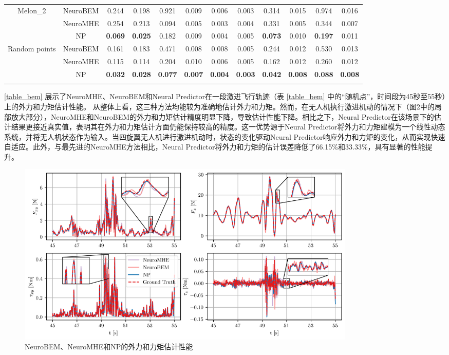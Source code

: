 \documentclass[lang=chs, degree=master, blindreview=true, winfonts=true]{yanputhesis}
\begin{document}
\begin{table}[h]
\begin{tabular}{c c c c c c c c c c c c}
	\hline
	\multirow{3}{*}{Melon\_2} & NeuroBEM & 0.244 & 0.198 & 0.921 & 0.009 & 0.006 & 0.003 & 0.314 & 0.015 & 0.974 & 0.016 \\
	& NeuroMHE & 0.254 & 0.213 & 0.094 & 0.005 & 0.003 & 0.004 & 0.331 & 0.005 & 0.344 & 0.007 \\
	& NP & \textbf{0.069} & \textbf{0.025} & 0.182 & 0.009 & 0.004 & 0.005 & \textbf{0.073} & 0.010 & \textbf{0.197} & 0.011 \\
	\hline
	\multirow{3}{*}{Random points} & NeuroBEM & 0.161 & 0.183 & 0.471 & 0.008 & 0.008 & 0.005 & 0.244 & 0.012 & 0.530 & 0.013 \\
	& NeuroMHE & 0.115 & 0.114 & 0.204 & 0.010 & 0.006 & 0.005 & 0.162 & 0.012 & 0.260 & 0.012 \\
	& NP & \textbf{0.032} & \textbf{0.028} & \textbf{0.077} & \textbf{0.007} & \textbf{0.004} & \textbf{0.003} & \textbf{0.042} & \textbf{0.008} & \textbf{0.088} & \textbf{0.008} \\
	\Xhline{1.pt}
\end{tabular}
\end{table}

\autoref{table_bem} 展示了NeuroMHE、NeuroBEM和Neural Predictor在一段激进飞行轨迹（表 \ref{table_bem} 中的“随机点”，时间段为45秒至55秒）上的外力和力矩估计性能。
从整体上看，这三种方法均能较为准确地估计外力和力矩。然而，在无人机执行激进机动的情况下（图2中的局部放大部分），NeuroMHE和NeuroBEM的外力和力矩估计精度明显下降，导致估计性能下降。相比之下，Neural Predictor在该场景下的估计结果更接近真实值，表明其在外力和力矩估计方面仍能保持较高的精度。这一优势源于Neural Predictor将外力和力矩建模为一个线性动态系统，并将无人机状态作为输入。当四旋翼无人机进行激进机动时，状态的变化驱动Neural Predictor响应外力和力矩的变化，从而实现快速自适应。此外，与最先进的NeuroMHE方法相比，Neural Predictor将外力和力矩的估计误差降低了66.15\%和33.33\%，具有显著的性能提升。

\begin{figure}[hbt!]
	\hspace{-0.6cm}  %
	\centering
	\includegraphics[width=39pc]{picture/bem_comparison.png} 
	\caption{NeuroBEM、NeuroMHE和NP的外力和力矩估计性能} 
	\label{3-5}
\end{figure}
\end{document}
